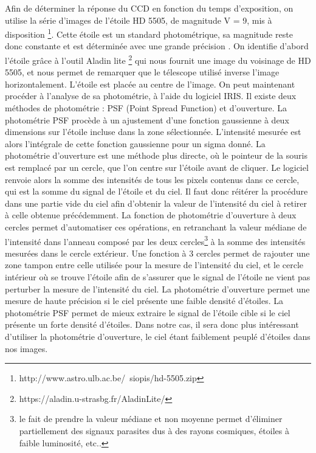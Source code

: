 \documentclass[10pt,french, openany]{book}
\begin{document}
    Afin de déterminer la réponse du CCD en fonction du temps d'exposition, on utilise la série d'images de l'étoile HD 5505, de magnitude V = 9, mis à disposition \footnote{http://www.astro.ulb.ac.be/~siopis/hd-5505.zip}. Cette étoile est un standard photométrique, sa magnitude reste donc constante et est déterminée avec une grande précision \cite{notes}. On identifie d'abord l'étoile grâce à l'outil Aladin lite \footnote{https://aladin.u-strasbg.fr/AladinLite/} qui nous fournit une image du voisinage de HD 5505, et nous permet de remarquer que le télescope utilisé inverse l'image horizontalement. L'étoile est placée au centre de l'image. On peut maintenant procéder à l'analyse de sa photométrie, à l'aide du logiciel IRIS. Il existe deux méthodes de photométrie : PSF (Point Spread Function) et d'ouverture. La photométrie PSF procède à un ajustement d'une fonction gaussienne à deux dimensions sur l'étoile incluse dans la zone sélectionnée. L'intensité mesurée est alors l'intégrale de cette fonction gaussienne pour un sigma donné. La photométrie d'ouverture est une méthode plus directe, où le pointeur de la souris est remplacé par un cercle, que l'on centre sur l'étoile avant de cliquer. Le logiciel renvoie alors la somme des intensités de tous les pixels contenus dans ce cercle, qui est la somme du signal de l'étoile et du ciel. Il faut donc réitérer la procédure dans une partie vide du ciel afin d'obtenir la valeur de l'intensité du ciel à retirer à celle obtenue précédemment. La fonction de photométrie d'ouverture à deux cercles permet d'automatiser ces opérations, en retranchant la valeur médiane de l'intensité dans l'anneau composé par les deux cercles\footnote{le fait de prendre la valeur médiane et non moyenne permet d'éliminer partiellement des signaux parasites dus à des rayons cosmiques, étoiles à faible luminosité, etc..} à la somme des intensités mesurées dans le cercle extérieur. Une fonction à 3 cercles permet de rajouter une zone tampon entre celle utilisée pour la mesure de l'intensité du ciel, et le cercle intérieur où se trouve l'étoile afin de s'assurer que le signal de l'étoile ne vient pas perturber la mesure de l'intensité du ciel. La photométrie d'ouverture permet une mesure de haute précision si le ciel présente une faible densité d'étoiles. La photométrie PSF permet de mieux extraire le signal de l'étoile cible si le ciel présente un forte densité d'étoiles. Dans notre cas, il sera donc plus intéressant d'utiliser la photométrie d'ouverture, le ciel étant faiblement peuplé d'étoiles dans nos images.\cite{site:iris, inbook:warner:primer} 
    
\end{document}
